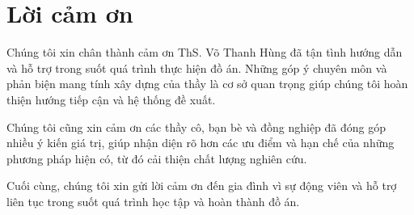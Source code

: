 \chapter*{Lời cảm ơn}

Chúng tôi xin chân thành cảm ơn ThS. Võ Thanh Hùng đã tận tình hướng dẫn và hỗ trợ trong suốt quá trình thực hiện đồ án. Những góp ý chuyên môn và phản biện mang tính xây dựng của thầy là cơ sở quan trọng giúp chúng tôi hoàn thiện hướng tiếp cận và hệ thống đề xuất.

\noindent Chúng tôi cũng xin cảm ơn các thầy cô, bạn bè và đồng nghiệp đã đóng góp nhiều ý kiến giá trị, giúp nhận diện rõ hơn các ưu điểm và hạn chế của những phương pháp hiện có, từ đó cải thiện chất lượng nghiên cứu.

\noindent Cuối cùng, chúng tôi xin gửi lời cảm ơn đến gia đình vì sự động viên và hỗ trợ liên tục trong suốt quá trình học tập và hoàn thành đồ án.